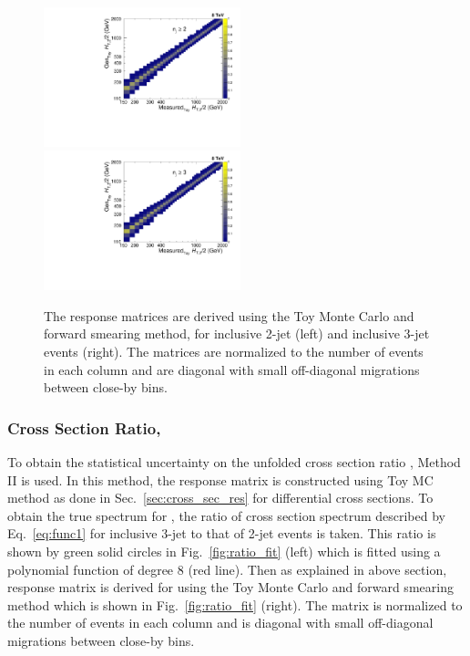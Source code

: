 \begin{figure}[!htbp]
 \begin{center}
 \includegraphics[width=0.51\textwidth]{Plots_HT_2_150/Normalized_Response_Matrix_NLO_2_range_column.pdf}%
 ~~\includegraphics[width=0.51\textwidth]{Plots_HT_2_150/Normalized_Response_Matrix_NLO_3_column.pdf} 
 \caption{The response matrices are derived using the Toy Monte Carlo and forward smearing method, for inclusive 2-jet (left) and inclusive 3-jet events (right). The matrices are normalized to the number of events in each column and are diagonal with small off-diagonal migrations between close-by \httwo bins.}
 \label{fig:response_NLO}
 \end{center}
\end{figure}

\subsubsection{Cross Section Ratio, \texorpdfstring{\ratio}{R-32)}}
To obtain the statistical uncertainty on the unfolded cross section ratio \ratio, Method II is used. In this method, the response matrix is constructed using Toy MC method as done in Sec.~\ref{sec:cross_sec_res} for differential cross sections. To obtain the true spectrum for \ratio, the ratio of cross section spectrum described by Eq.~\ref{eq:func1} for inclusive 3-jet to that of 2-jet events is taken. This ratio is shown by green solid circles in Fig.~\ref{fig:ratio_fit} (left) which is fitted using a polynomial function of degree 8 (red line). Then as explained in above section, response matrix is derived for \ratio using the Toy Monte Carlo and forward smearing method which is shown in Fig.~\ref{fig:ratio_fit} (right). The matrix is normalized to the number of events in each column and is diagonal with small off-diagonal migrations between close-by \httwo bins.

